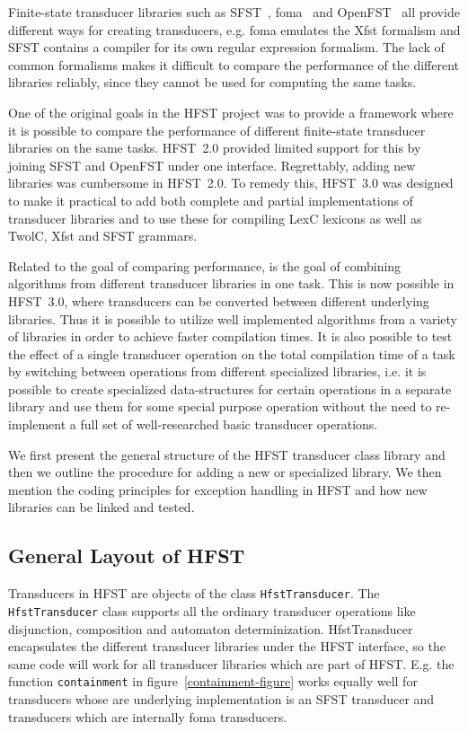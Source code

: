 \documentclass{llncs}
\begin{document}
Finite-state transducer libraries such as SFST~\cite{schmid/2005},
foma~\cite{hulden/2009} and OpenFST~\cite{openfst/2007} all provide
different ways for creating transducers, e.g. foma emulates the Xfst
formalism and SFST contains a compiler for its own regular expression
formalism. The lack of common formalisms makes it difficult to compare
the performance of the different libraries reliably, since they cannot
be used for computing the same tasks. 
 
One of the original goals in the HFST project was to provide a
framework where it is possible to compare the performance of different
finite-state transducer libraries on the same tasks. HFST~2.0 provided
limited support for this by joining SFST and OpenFST under one
interface. Regrettably, adding new libraries was cumbersome in HFST~2.0. 
To remedy this, HFST~3.0 was designed to make it practical to add both
complete and partial implementations of transducer libraries and to use
these for compiling LexC lexicons as well as TwolC, Xfst and SFST grammars.

Related to the goal of comparing performance, is the goal of combining
algorithms from different transducer libraries in one task. This is
now possible in HFST~3.0, where transducers can be converted between
different underlying libraries. Thus it is possible to utilize well
implemented algorithms from a variety of libraries in order to achieve
faster compilation times. It is also possible to test the effect of a
single transducer operation on the total compilation time of a task by
switching between operations from different specialized libraries, i.e. 
it is possible to create specialized data-structures for certain operations 
in a separate library and use them for some special purpose operation 
without the need to re-implement a full set of well-researched 
basic transducer operations.

We first present the general structure of the HFST transducer class library
and then we outline the procedure for adding a new or specialized library.
We then mention the coding principles for exception handling in HFST and
how new libraries can be linked and tested.

\subsection{General Layout of HFST}

Transducers in HFST are objects of the class {\tt HfstTransducer}. The
{\tt HfstTrans\-ducer} class supports all the ordinary transducer
operations like disjunction, composition and automaton determinization. 
HfstTransducer encapsulates the different transducer
libraries under the HFST interface, so the same code will work for all
transducer libraries which are part of HFST. E.g. the function {\tt containment} in figure~\ref{containment-figure} works equally well for transducers whose are underlying implementation is an SFST transducer and transducers which are internally foma transducers.
\end{document}
